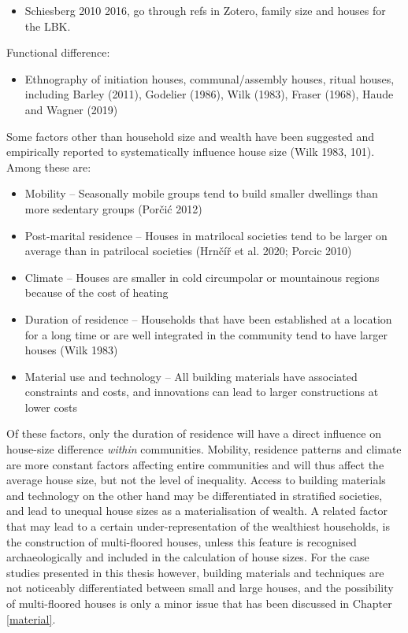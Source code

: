 \documentclass[
  12pt,
  a4paper, twoside]{book}
\providecommand{\tightlist}{%
  \setlength{\itemsep}{0pt}\setlength{\parskip}{0pt}}
\begin{document}
\begin{itemize}
\tightlist
\item
  Schiesberg 2010 2016, go through refs in Zotero, family size and houses for the LBK.
\end{itemize}

Functional difference:

\begin{itemize}
\tightlist
\item
  Ethnography of initiation houses, communal/assembly houses, ritual houses, including Barley (2011), Godelier (1986), Wilk (1983), Fraser (1968), Haude and Wagner (2019)
\end{itemize}

Some factors other than household size and wealth have been suggested and empirically reported to systematically influence house size (Wilk 1983, 101). Among these are:

\begin{itemize}
\item
  Mobility -- Seasonally mobile groups tend to build smaller dwellings than more sedentary groups (Porčić 2012)
\item
  Post-marital residence -- Houses in matrilocal societies tend to be larger on average than in patrilocal societies (Hrnčíř et al. 2020; Porcic 2010)
\item
  Climate -- Houses are smaller in cold circumpolar or mountainous regions because of the cost of heating
\item
  Duration of residence -- Households that have been established at a location for a long time or are well integrated in the community tend to have larger houses (Wilk 1983)
\item
  Material use and technology -- All building materials have associated constraints and costs, and innovations can lead to larger constructions at lower costs
\end{itemize}

Of these factors, only the duration of residence will have a direct influence on house-size difference \emph{within} communities. Mobility, residence patterns and climate are more constant factors affecting entire communities and will thus affect the average house size, but not the level of inequality. Access to building materials and technology on the other hand may be differentiated in stratified societies, and lead to unequal house sizes as a materialisation of wealth. A related factor that may lead to a certain under-representation of the wealthiest households, is the construction of multi-floored houses, unless this feature is recognised archaeologically and included in the calculation of house sizes. For the case studies presented in this thesis however, building materials and techniques are not noticeably differentiated between small and large houses, and the possibility of multi-floored houses is only a minor issue that has been discussed in Chapter \ref{material}.
\end{document}
